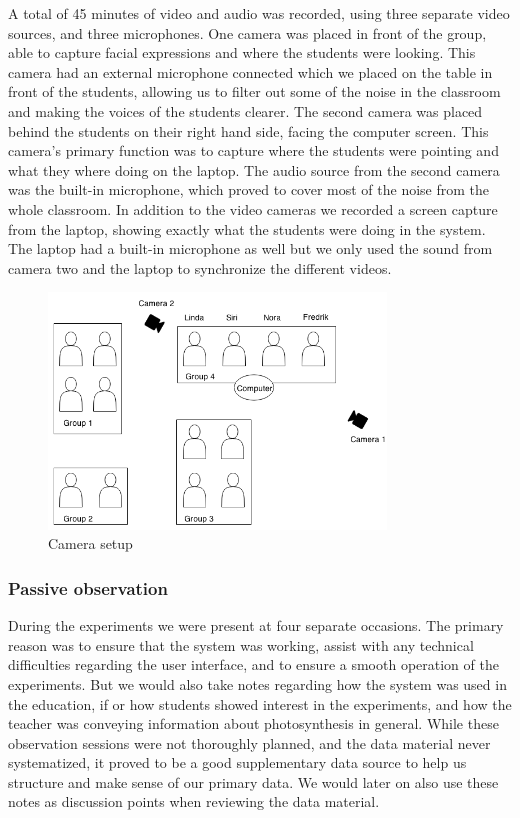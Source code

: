 A total of 45 minutes of video and audio was recorded, using three separate video sources, and three microphones. One camera was placed in front of the group, able to capture facial expressions and where the students were looking. This camera had an external microphone connected which we placed on the table in front of the students, allowing us to filter out some of the noise in the classroom and making the voices of the students clearer. The second camera was placed behind the students on their right hand side, facing the computer screen. This camera's primary function was to capture where the students were pointing and what they where doing on the laptop. The audio source from the second camera was the built-in microphone, which proved to cover most of the noise from the whole classroom. In addition to the video cameras we recorded a screen capture from the laptop, showing exactly what the students were doing in the system. The laptop had a built-in microphone as well but we only used the sound from camera two and the laptop to synchronize the different videos.
\begin{figure}
\centering
\includegraphics[width=0.8\textwidth]{img/empiricalsetting/class_diagram.png}
\caption{Camera setup}
\label{fig:camerasetup}
\end{figure}

\subsubsection{Passive observation}
During the experiments we were present at four separate occasions. The primary reason was to ensure that the system was working, assist with any technical difficulties regarding the user interface, and to ensure a smooth operation of the experiments. But we would also take notes regarding how the system was used in the education, if or how students showed interest in the experiments, and how the teacher was conveying information about photosynthesis in general. While these observation sessions were not thoroughly planned, and the data material never systematized, it proved to be a good supplementary data source to help us structure and make sense of our primary data. We would later on also use these notes as discussion points when reviewing the data material. 

